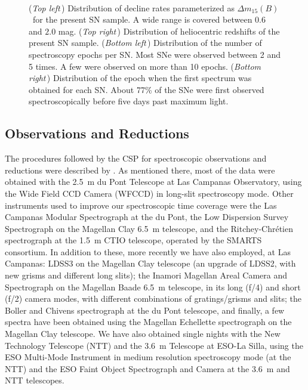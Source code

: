 \documentclass[apj]{emulateapj-rtx4}
\newcommand{\dm}{$\Delta m_{15}(B)$}
\begin{document}
\begin{figure}[htpb]%
\\
\caption{({\em Top left\,}) Distribution of decline rates
  parameterized as \dm\ for the present SN sample. A wide range is
  covered between $0.6$ and $2.0$ mag. ({\em Top right\,})
  Distribution of heliocentric redshifts of the present SN sample.
  ({\em Bottom left\,}) Distribution of the number of spectroscopy
  epochs per SN. Most SNe were observed between 2 and 5 times. A few
  were observed on more than 10 epochs. ({\em Bottom right\,}) Distribution 
  of the epoch when the first spectrum was obtained for each SN. About
  77\% of the SNe were first observed spectroscopically
  before five days past maximum light.
  \label{fig:hist}}
\end{figure}

\subsection{Observations and Reductions}
\label{sec:obs}

The procedures followed by the CSP for spectroscopic observations and 
reductions were described by \citet{hamuy06}. As mentioned there,
most of the data were
obtained with the 2.5~m du Pont Telescope at Las Campanas  
Observatory, using the Wide Field CCD Camera (WFCCD) in 
long-slit spectroscopy mode. Other instruments used to
improve our spectroscopic time coverage were the Las Campanas
Modular Spectrograph at the du Pont, the Low Dispersion Survey Spectrograph
\citep[LDSS2;][]{allington94} on the Magellan Clay 6.5~m
telescope, and the Ritchey-Chr\'etien spectrograph at 
the 1.5~m CTIO telescope, operated by the SMARTS consortium. In
addition to these, more recently we have also employed,
at Las Campanas: LDSS3 on the Magellan Clay telescope (an upgrade of
LDSS2, with new grisms and different 
long slits); the Inamori Magellan Areal Camera and Spectrograph 
\citep[IMACS;][]{dressler11} on the Magellan Baade 6.5~m telescope, in
its long (f/4) and short 
(f/2) camera modes, with different combinations of gratings/grisms and
slits; the Boller and Chivens spectrograph at the du Pont telescope,
and finally, a few spectra have been obtained using the Magellan
Echellette \citep[MagE;][]{marshall08} spectrograph on the
Magellan Clay telescope.
We have also obtained single nights with the New Technology Telescope
(NTT) and the 3.6~m Telescope at ESO-La Silla,  
using the ESO Multi-Mode Instrument \citep[EMMI;][]{dekker86}
in medium resolution spectroscopy mode (at the NTT) and the ESO Faint Object
Spectrograph and Camera \citep[EFOSC;][]{buzzoni84} at the 3.6~m and
NTT telescopes. 
\end{document}
